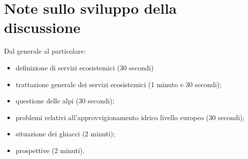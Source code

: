 \documentclass[14pt,a4paper]{article}
\begin{document}
	\section*{Note sullo sviluppo della discussione}
	Dal generale al particolare:
	\begin{itemize}
		\item definizione di servizi ecosistemici (30 secondi)
		\item trattazione generale dei servizi ecosistemici (1 minuto e 30 secondi);
		\item questione delle alpi (30 secondi);
		\item problemi relativi all'approvvigionamento idrico livello europeo (30 secondi);
		\item situazione dei ghiacci (2 minuti);
		\item prospettive  (2 minuti).
	\end{itemize}
\end{document}
